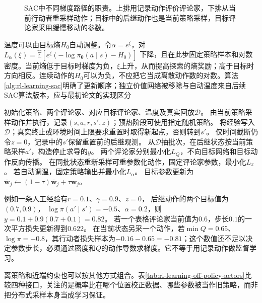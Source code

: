\begin{figure}[t]
  \centering
  
  \caption{SAC中不同梯度路径的职责。上排用记录动作评价评论家，下排从当前行动者重采样动作；目标中的后继动作也是当前策略采样，目标评论家采用缓慢移动的参数。}
  \label{fig:rl-learning-sac}
\end{figure}

温度可以由目标熵$H_0$自动调整。令$\alpha=e^\xi$，对
$L_\alpha(\xi)=
\widehat{\mathbb E}[e^\xi(-\log\pi_{\bm\theta}(a\mid s)-H_0)]$
下降，且在此步固定策略样本和对数密度。当前熵低于目标时梯度为负，$\xi$上升，从而提高探索的熵奖励；高于目标时方向相反。连续动作的$H_0$可以为负，不应把它当成离散动作数的对数。算法\ref{alg:rl-learning-sac}明确了更新顺序；独立价值网络被移除与自动温度来自后续SAC算法版本，应与最初论文的实现区分

\begin{algorithm}[SAC的真实数据与离策略更新循环]
  \label{alg:rl-learning-sac}
  \begin{algorithmic}[1]
    \State 初始化策略、两个评论家、对应目标评论家、温度及真实回放$\mathcal D$。
      \State 由当前策略采样动作并执行，记录$(s,a,r,s',z)$；预热阶段可使用指定随机策略。
      \State 将经验写入$\mathcal D$；真实终止或环境时间上限要求重置时取得新起点，否则转到$s'$。
      \State 仅时间截断仍令$z=0$，记录中的$s'$保留重置前的后继观测。
        \State 从$\mathcal D$抽批次，在后继状态按当前策略采样$a'$，构造停止求导的$y$。
        \State 两个评论家分别最小化$L_Q$，不向目标网络和目标动作反向传播。
        \State 在同批状态重新采样可重参数化动作，固定评论家参数，最小化$L_\pi$。
        \State 若自动调温，固定策略输出并最小化$L_\alpha$。
        \State 目标参数更新为$\bar{\bm w}_j\gets(1-\tau)\bar{\bm w}_j+\tau\bm w_j$。
      \EndFor
    \EndFor
  \end{algorithmic}
\end{algorithm}

例如一条人工经验有$r=0.1$、$\gamma=0.9$、$z=0$，
后继动作的两个目标值为$(0.7,0.9)$，
$\log\pi(a'\mid s')=-0.5$、$\alpha=0.2$，则$y=0.1+0.9(0.7+0.1)=0.82$。
若一个表格评论家当前值为$0.6$，步长$0.1$的一次平方损失更新得到$0.622$。
在当前状态另采一个动作，若$\min Q=0.65$、$\log\pi=-0.8$，其行动者损失样本为$-0.16-0.65=-0.81$；这个数值还不足以决定参数步长，必须通过密度和$Q$的动作导数求梯度。它不等于用记录动作做监督学习。

离策略和近端约束也可以按其他方式组合。表\ref{tab:rl-learning-off-policy-actors}比较四种接口，关注的是概率比在哪个位置校正数据、哪些参数被当作旧策略，而非把分布式采样本身当成学习保证。

